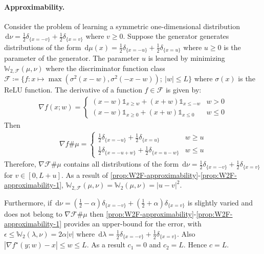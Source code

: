 \documentclass[10pt]{article}
\newcommand{\ud}{\,\mathrm{d}}
\newcommand{\W}{\mathds{W}}
\newcommand{\calF}{\mathcal{F}}
\numberwithin{equation}{section}
\begin{document}
\paragraph{Approximability.} Consider the problem of learning a symmetric one-dimensional distribution $\ud \nu = \frac{1}{2}\delta_{\{x=-v\}} + \frac{1}{2}\delta_{\{x=v\}}$ where $v\geq 0$. Suppose the generator generates distributions of the form $\ud \mu(x) = \frac{1}{2}\delta_{\{x=-u\}} + \frac{1}{2}\delta_{\{x=u\}}$ where $u\geq 0$ is the parameter of the generator. The parameter $u$ is learned by minimizing $\W_{2,\calF}(\mu,\nu)$ where the discriminator function class $\calF \coloneqq \{f:x\mapsto \max(\sigma^2(x-w),\sigma^2(-x-w));~|w|\leq L\}$ where $\sigma(x)$ is the ReLU function. 
The derivative of a function $f \in \calF$ is given by:
\begin{align*}
\nabla f(x;w) = \begin{cases} (x-w)\mathds{1}_{x\geq w} + (x+w)\mathds{1}_{x\leq -w} & w>0\\
(x-w)\mathds{1}_{x\geq 0} + (x+w)\mathds{1}_{x\leq 0} & w\leq 0
\end{cases}
\end{align*}
Then 
\begin{align*}
\nabla f \# \mu = \begin{cases}
\frac{1}{2}\delta_{\{x=-u\}} + \frac{1}{2}\delta_{\{x=u\}}& w\geq u \\
\frac{1}{2}\delta_{\{x=-u+w\}} + \frac{1}{2}\delta_{\{x=u-w\}}& w\leq u 
\end{cases}
\end{align*}
Therefore, $\nabla \calF \# \mu$ contains all distributions of the form 
$\ud \nu = \frac{1}{2}\delta_{\{x=-v\}} + \frac{1}{2}\delta_{\{x=v\}}$ for $v\in[0, L+u]$.
As a result of \autoref{prop:W2F-approximability}-\eqref{prop:W2F-approximability-1}, $\W_{2,\calF}(\mu,\nu)=\W_2(\mu,\nu)= |u-v|^2$. 
	
	Furthermore, if $\ud \nu = (\frac{1}{2}-\alpha)\delta_{\{x=-v\}} + (\frac{1}{2}+\alpha)\delta_{\{x=v\}}$ is slightly varied and does not belong to $\nabla \calF \# \mu$ then \autoref{prop:W2F-approximability}-\eqref{prop:W2F-approximability-1} provides an upper-bound for the error, with $\epsilon \leq \W_2(\lambda,\nu)=2\alpha|v|$ where $\ud \lambda =\frac{1}{2}\delta_{\{x=-v\}} + \frac{1}{2}\delta_{\{x=v\}}$. Also $|\nabla f^\star(y;w) -x|\leq w \leq L$. As a result $c_1=0$ and $c_2=L$. Hence $c=L$. 
\end{document}
